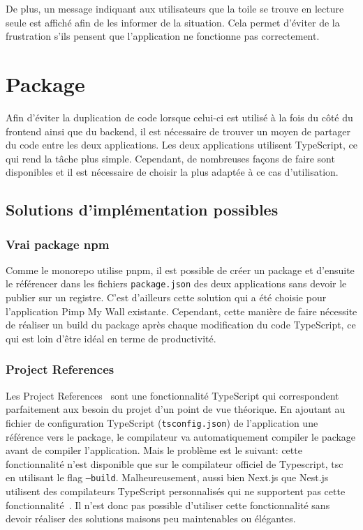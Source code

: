 De plus, un message indiquant aux utilisateurs que la toile se trouve en lecture seule est affiché afin de les informer de la situation. Cela permet d'éviter de la frustration s'ils pensent que l'application ne fonctionne pas correctement.

\section{Package}

Afin d'éviter la duplication de code lorsque celui-ci est utilisé à la fois du côté du frontend ainsi que du backend, il est nécessaire de trouver un moyen de partager du code entre les deux applications. Les deux applications utilisent TypeScript, ce qui rend la tâche plus simple. Cependant, de nombreuses façons de faire sont disponibles et il est nécessaire de choisir la plus adaptée à ce cas d'utilisation.

\subsection{Solutions d'implémentation possibles}

\subsubsection{Vrai package npm}

Comme le monorepo utilise \gls{pnpm}, il est possible de créer un package et d'ensuite le référencer dans les fichiers \texttt{package.json} des deux applications sans devoir le publier sur un registre. C'est d'ailleurs cette solution qui a été choisie pour l'application Pimp My Wall existante. Cependant, cette manière de faire nécessite de réaliser un build du package après chaque modification du code TypeScript, ce qui est loin d'être idéal en terme de productivité.

\subsubsection{Project References}

Les Project References~\cite{project-references} sont une fonctionnalité TypeScript qui correspondent parfaitement aux besoin du projet d'un point de vue théorique. En ajoutant au fichier de configuration TypeScript (\texttt{tsconfig.json}) de l'application une référence vers le package, le compilateur va automatiquement compiler le package avant de compiler l'application. Mais le problème est le suivant: cette fonctionnalité n'est disponible que sur le compilateur officiel de Typescript, tsc~\cite{tsc} en utilisant le flag \texttt{--build}. Malheureusement, aussi bien Next.js que Nest.js utilisent des compilateurs TypeScript personnalisés qui ne supportent pas cette fonctionnalité~\cite{nest-tsc-build-option}. Il n'est donc pas possible d'utiliser cette fonctionnalité sans devoir réaliser des solutions maisons peu maintenables ou élégantes.

